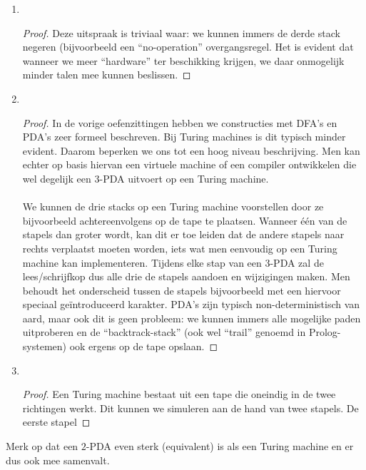 \documentclass[a4paper]{article}
\begin{document}
\begin{answer}
\begin{enumerate}
 \begin{enumerate}
 \item ~~
 \begin{proof}
 Deze uitspraak is triviaal waar: we kunnen immers de derde stack negeren (bijvoorbeeld een ``no-operation'' overgangsregel. Het is evident dat wanneer we meer ``hardware'' ter beschikking krijgen, we daar onmogelijk minder talen mee kunnen beslissen.
 \end{proof}
 \item ~~
 \begin{proof}
 In de vorige oefenzittingen hebben we constructies met DFA's en PDA's zeer formeel beschreven. Bij Turing machines is dit typisch minder evident. Daarom beperken we ons tot een hoog niveau beschrijving. Men kan echter op basis hiervan een virtuele machine of een compiler ontwikkelen die wel degelijk een $3$-PDA uitvoert op een Turing machine.
 \paragraph{}
 We kunnen de drie stacks op een Turing machine voorstellen door ze bijvoorbeeld achtereenvolgens op de tape te plaatsen. Wanneer \'e\'en van de stapels dan groter wordt, kan dit er toe leiden dat de andere stapels naar rechts verplaatst moeten worden, iets wat men eenvoudig op een Turing machine kan implementeren. Tijdens elke stap van een $3$-PDA zal de lees/schrijfkop dus alle drie de stapels aandoen en wijzigingen maken. Men behoudt het onderscheid tussen de stapels bijvoorbeeld met een hiervoor speciaal ge\"introduceerd karakter. PDA's zijn typisch non-deterministisch van aard, maar ook dit is geen probleem: we kunnen immers alle mogelijke paden uitproberen en de ``backtrack-stack'' (ook wel ``trail'' genoemd in Prolog-systemen) ook ergens op de tape opslaan.
 \end{proof}
 \item ~~
 \begin{proof}
 Een Turing machine bestaat uit een tape die oneindig in de twee richtingen werkt. Dit kunnen we simuleren aan de hand van twee stapels. De eerste stapel 
 \end{proof}
\end{enumerate}
\begin{note}
Merk op dat een $2$-PDA even sterk (equivalent) is als een Turing machine en er dus ook mee samenvalt.
\end{note}
\end{enumerate}
\end{answer}
\end{document}
